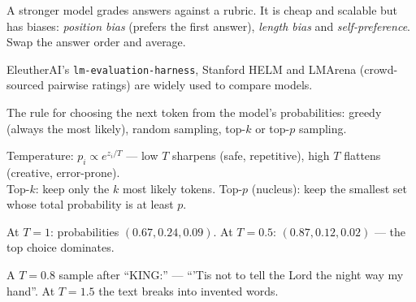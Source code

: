 \documentclass[11pt,a4paper]{article}
\begin{document}
\begin{bdef}
A stronger model grades answers against a rubric. It is cheap and scalable but has biases: \emph{position bias} (prefers the first answer), \emph{length bias} and \emph{self-preference}. Swap the answer order and average.
\end{bdef}
\begin{bapp}
EleutherAI's \texttt{lm-evaluation-harness}, Stanford HELM and LMArena (crowd-sourced pairwise ratings) are widely used to compare models.
\end{bapp}


\begin{bdef}[Decoding]
The rule for choosing the next token from the model's probabilities: greedy (always the most likely), random sampling, top-$k$ or top-$p$ sampling.
\end{bdef}
\begin{bmath}
Temperature: $p_i\propto e^{z_i/T}$ --- low $T$ sharpens (safe, repetitive), high $T$ flattens (creative, error-prone).\\
Top-$k$: keep only the $k$ most likely tokens. \;Top-$p$ (nucleus): keep the smallest set whose total probability is at least $p$.
\end{bmath}
\begin{bex}[Logits $(2,1,0)$]
At $T=1$: probabilities $(0.67, 0.24, 0.09)$. At $T=0.5$: $(0.87, 0.12, 0.02)$ --- the top choice dominates.
\end{bex}
\begin{bres}
A $T=0.8$ sample after ``KING:'' --- ``'Tis not to tell the Lord the night way my hand''. At $T=1.5$ the text breaks into invented words.
\end{bres}
\end{document}
